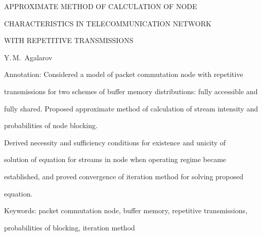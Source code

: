 APPROXIMATE METHOD OF CALCULATION OF NODE 


CHARACTERISTICS IN TELECOMMUNICATION NETWORK 


WITH REPETITIVE TRANSMISSIONS


Y.\,M.~Agalarov


  


  Annotation: Considered a model of packet commutation node with repetitive 


transmissions for two schemes of buffer memory distributions: fully accessible and 


fully shared. Proposed approximate method of calculation of stream intensity and 


probabilities of node blocking.


  Derived necessity and sufficiency conditions for existence and unicity of 


solution of equation for streams in node when operating regime became 


established, and proved convergence of iteration method for solving proposed 


equation. 


  


  Keywords: packet commutation node, buffer memory, repetitive transmissions, 


probabilities of blocking, iteration method





